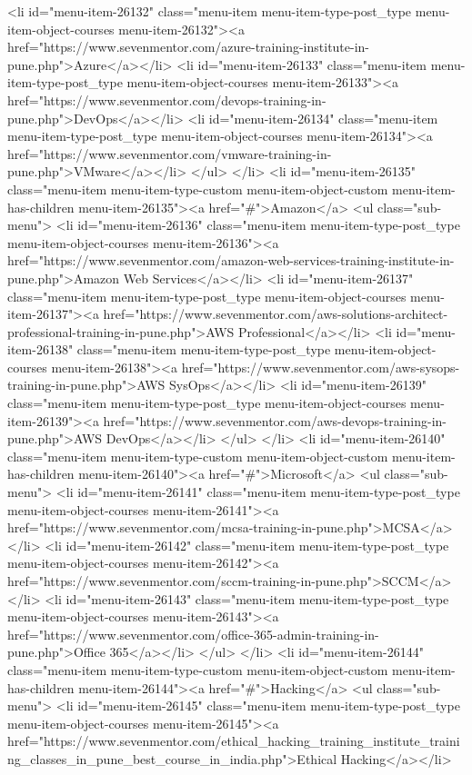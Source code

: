{<li id="menu-item-26132" class="menu-item menu-item-type-post_type menu-item-object-courses menu-item-26132"><a href="https://www.sevenmentor.com/azure-training-institute-in-pune.php">Azure</a></li>
<li id="menu-item-26133" class="menu-item menu-item-type-post_type menu-item-object-courses menu-item-26133"><a href="https://www.sevenmentor.com/devops-training-in-pune.php">DevOps</a></li>
<li id="menu-item-26134" class="menu-item menu-item-type-post_type menu-item-object-courses menu-item-26134"><a href="https://www.sevenmentor.com/vmware-training-in-pune.php">VMware</a></li>
</ul>
</li>
<li id="menu-item-26135" class="menu-item menu-item-type-custom menu-item-object-custom menu-item-has-children menu-item-26135"><a href="#">Amazon</a>
<ul class="sub-menu">
<li id="menu-item-26136" class="menu-item menu-item-type-post_type menu-item-object-courses menu-item-26136"><a href="https://www.sevenmentor.com/amazon-web-services-training-institute-in-pune.php">Amazon Web Services</a></li>
<li id="menu-item-26137" class="menu-item menu-item-type-post_type menu-item-object-courses menu-item-26137"><a href="https://www.sevenmentor.com/aws-solutions-architect-professional-training-in-pune.php">AWS Professional</a></li>
<li id="menu-item-26138" class="menu-item menu-item-type-post_type menu-item-object-courses menu-item-26138"><a href="https://www.sevenmentor.com/aws-sysops-training-in-pune.php">AWS SysOps</a></li>
<li id="menu-item-26139" class="menu-item menu-item-type-post_type menu-item-object-courses menu-item-26139"><a href="https://www.sevenmentor.com/aws-devops-training-in-pune.php">AWS DevOps</a></li>
</ul>
</li>
<li id="menu-item-26140" class="menu-item menu-item-type-custom menu-item-object-custom menu-item-has-children menu-item-26140"><a href="#">Microsoft</a>
<ul class="sub-menu">
<li id="menu-item-26141" class="menu-item menu-item-type-post_type menu-item-object-courses menu-item-26141"><a href="https://www.sevenmentor.com/mcsa-training-in-pune.php">MCSA</a></li>
<li id="menu-item-26142" class="menu-item menu-item-type-post_type menu-item-object-courses menu-item-26142"><a href="https://www.sevenmentor.com/sccm-training-in-pune.php">SCCM</a></li>
<li id="menu-item-26143" class="menu-item menu-item-type-post_type menu-item-object-courses menu-item-26143"><a href="https://www.sevenmentor.com/office-365-admin-training-in-pune.php">Office 365</a></li>
</ul>
</li>
<li id="menu-item-26144" class="menu-item menu-item-type-custom menu-item-object-custom menu-item-has-children menu-item-26144"><a href="#">Hacking</a>
<ul class="sub-menu">
<li id="menu-item-26145" class="menu-item menu-item-type-post_type menu-item-object-courses menu-item-26145"><a href="https://www.sevenmentor.com/ethical_hacking_training_institute_training_classes_in_pune_best_course_in_india.php">Ethical Hacking</a></li>
}
